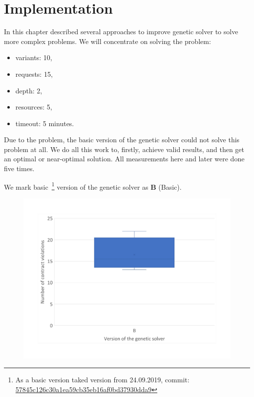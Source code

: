 \chapter{Implementation}\label{chapter:Implementation}

In this chapter described several approaches to improve genetic solver to solve more complex problems.
We will concentrate on solving the problem:

\begin{itemize}
	\item variants: 10,
	\item requests: 15,
	\item depth: 2,
	\item resources: 5,
	\item timeout: 5 minutes.
\end{itemize}

Due to the problem, the basic version of the genetic solver could not solve this problem at all. We do all this work to, firstly, achieve valid results, and then get an optimal or near-optimal solution. 
All measurements here and later were done five times.


We mark basic~\footnote{As a basic version taked version from 24.09.2019, commit: \href{https://git-st.inf.tu-dresden.de/mquat/mquat2/commit/57845c126c30a1ea59cb35eb16af0bd37930dda9}{57845c126c30a1ea59cb35eb16af0bd37930dda9}} version of the genetic solver as \textbf{B} (Basic).


\begin{figure}[h]
	\centering
	\includegraphics[width=\textwidth]{images/BoxPlotSolverBasic}
	\caption[Boxplot with a number of contract violations for the basic version of genetic solver]{}
	\label{fig:boxplotsolverbasic}
\end{figure}


